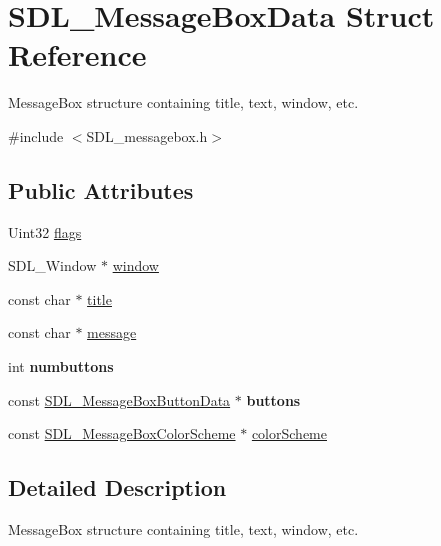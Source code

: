 \hypertarget{structSDL__MessageBoxData}{\section{S\+D\+L\+\_\+\+Message\+Box\+Data Struct Reference}
\label{structSDL__MessageBoxData}
}


Message\+Box structure containing title, text, window, etc.  




{\ttfamily \#include $<$S\+D\+L\+\_\+messagebox.\+h$>$}

\subsection*{Public Attributes}
\begin{DoxyCompactItemize}
\item 
Uint32 \hyperlink{structSDL__MessageBoxData_a113d016f760bf4e4156b0f376358d6a0}{flags}
\item 
S\+D\+L\+\_\+\+Window $\ast$ \hyperlink{structSDL__MessageBoxData_a3eaa3159704da921567882a1b9c84f0b}{window}
\item 
const char $\ast$ \hyperlink{structSDL__MessageBoxData_aff11d8661ef298059823d387be201741}{title}
\item 
const char $\ast$ \hyperlink{structSDL__MessageBoxData_acbdbaaa13703e12193a0cd0b8373f8a4}{message}
\item 
\hypertarget{structSDL__MessageBoxData_a133f4fef549cc0cb14b799af35f3dc5a}{int {\bfseries numbuttons}}\label{structSDL__MessageBoxData_a133f4fef549cc0cb14b799af35f3dc5a}

\item 
\hypertarget{structSDL__MessageBoxData_adae2b2e338f7e50a8b3e31b5985b81c2}{const \hyperlink{structSDL__MessageBoxButtonData}{S\+D\+L\+\_\+\+Message\+Box\+Button\+Data} $\ast$ {\bfseries buttons}}\label{structSDL__MessageBoxData_adae2b2e338f7e50a8b3e31b5985b81c2}

\item 
const \hyperlink{structSDL__MessageBoxColorScheme}{S\+D\+L\+\_\+\+Message\+Box\+Color\+Scheme} $\ast$ \hyperlink{structSDL__MessageBoxData_af6345341d6c7271c3322dd05cb2c4fd4}{color\+Scheme}
\end{DoxyCompactItemize}


\subsection{Detailed Description}
Message\+Box structure containing title, text, window, etc. 

